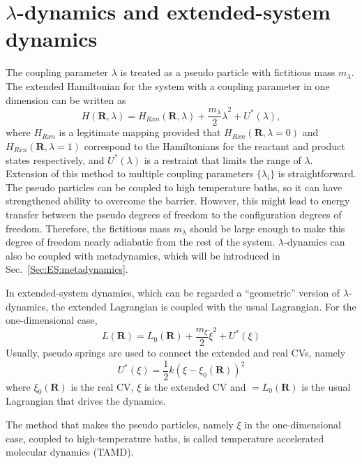 \section{\texorpdfstring{$\lambda$-dynamics and extended-system dynamics}{λ-dynamics and extended-system dynamics}\label{Sec:ES:lambdadynamics}}
The coupling parameter $\lambda$ is treated as a pseudo particle with fictitious mass $m_\lambda$.
The extended Hamiltonian for the system with a coupling parameter in one dimension can be written as
\begin{equation}
	H(\mathbf{R},\lambda)=H_{Rxn}(\mathbf{R},\lambda) + \frac{m_\lambda}{2}{\dot{\lambda}}^2+U^{*}(\lambda),
\end{equation}
where $H_{Rxn}$ is a legitimate mapping provided that $H_{Rxn}(\mathbf{R},\lambda=0)$ and $H_{Rxn}(\mathbf{R},\lambda=1)$ correspond to the Hamiltonians for the reactant and product states respectively, and $U^{*}(\lambda)$ is a restraint that limits the range of $\lambda$. Extension of this method to multiple coupling parameters $\{\lambda_i\}$ is straightforward. The pseudo particles can be coupled to high temperature baths, so it can have strengthened ability to overcome the barrier. However, this might lead to energy transfer between the pseudo degrees of freedom to the configuration degrees of freedom. Therefore, the fictitious mass $m_\lambda$ should be large enough to make this degree of freedom nearly adiabatic from the rest of the system.\cite{AbramsJCP2006} $\lambda$-dynamics can also be coupled with metadynamics,\cite{WuJPCL2011} which will be introduced in Sec.~\ref{Sec:ES:metadynamics}.

In extended-system dynamics, which can be regarded a ``geometric'' version of $\lambda$-dynamics, the extended Lagrangian is coupled with the usual Lagrangian. For the one-dimensional case,
\begin{equation}
	L(\mathbf{R})=L_{0}(\mathbf{R}) + \frac{m_\xi}{2}{\dot{\xi}}^2+U^{*}(\xi)
\end{equation}
Usually, pseudo springs are used to connect the extended and real CVs, namely
\begin{equation}
	U^{*}(\xi)=\frac{1}{2}k(\xi-\xi_{0}(\mathbf{R}))^{2}
\end{equation}
where $\xi_{0}(\mathbf{R})$ is the real CV, $\xi$ is the extended CV and $=L_{0}(\mathbf{R})$ is the usual Lagrangian that drives the dynamics.

The method that makes the pseudo particles, namely $\xi$ in the one-dimensional case, coupled to high-temperature baths, is called temperature accelerated molecular dynamics (TAMD).\cite{MaraglianoCPL2006} 

